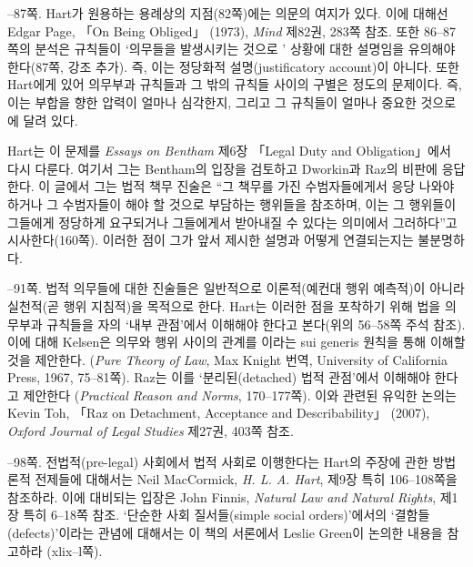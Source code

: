{--87쪽.  Hart가 원용하는 용례상의
지점(82쪽)에는 의문의 여지가 있다. 이에 대해선 Edgar Page, 「On Being
Obliged」 (1973), \emph{Mind} 제82권, 283쪽 참조. 또한 86--87쪽의 분석은
규칙들이 ‘의무들을 발생시키는 것으로 ’
상황에 대한 설명임을 유의해야 한다(87쪽, 강조 추가). 즉, 이는 정당화적
설명(justificatory account)이 아니다. 또한 Hart에게 있어 의무부과
규칙들과 그 밖의 규칙들 사이의 구별은 정도의 문제이다. 즉, 이는 부합을
향한 압력이 얼마나 심각한지, 그리고 그 규칙들이 얼마나 중요한 것으로
에 달려 있다.

Hart는 이 문제를 \emph{Essays on Bentham} 제6장 「Legal Duty and
Obligation」에서 다시 다룬다. 여기서 그는 Bentham의 입장을 검토하고
Dworkin과 Raz의 비판에 응답한다. 이 글에서 그는 법적 책무 진술은 “그
책무를 가진 수범자들에게서 응당 나와야 하거나 그 수범자들이 해야 할
것으로 부담하는 행위들을 참조하며, 이는 그 행위들이 그들에게 정당하게
요구되거나 그들에게서 받아내질 수 있다는 의미에서 그러하다”고
시사한다(160쪽). 이러한 점이 그가 앞서 제시한 설명과 어떻게 연결되는지는
불분명하다.

--91쪽.  법적 의무들에 대한 진술들은 일반적으로 이론적(예컨대
행위 예측적)이 아니라 실천적(곧 행위 지침적)을 목적으로 한다. Hart는
이러한 점을 포착하기 위해 법을 의무부과 규칙들을
 자의 ‘내부 관점’에서 이해해야 한다고 본다(위의
56--58쪽 주석 참조). 이에 대해 Kelsen은 의무와 행위 사이의 관계를
이라는 sui generis 원칙을 통해 이해할 것을
제안한다. (\emph{Pure Theory of Law}, Max Knight 번역, University of
California Press, 1967, 75--81쪽). Raz는 이를 ‘분리된(detached) 법적
관점’에서 이해해야 한다고 제안한다 (\emph{Practical Reason and Norms},
170--177쪽). 이와 관련된 유익한 논의는 Kevin Toh, 「Raz on Detachment,
Acceptance and Describability」 (2007), \emph{Oxford Journal of Legal
Studies} 제27권, 403쪽 참조.

--98쪽.  전법적(pre-legal) 사회에서
법적 사회로 이행한다는 Hart의 주장에 관한 방법론적 전제들에 대해서는
Neil MacCormick, \emph{H. L. A. Hart}, 제9장 특히 106--108쪽을 참조하라.
이에 대비되는 입장은 John Finnis, \emph{Natural Law and Natural Rights},
제1장 특히 6--18쪽 참조. ‘단순한 사회 질서들(simple social
orders)’에서의 ‘결함들(defects)’이라는 관념에 대해서는 이 책의 서론에서
Leslie Green이 논의한 내용을 참고하라 (xlix--l쪽).
}
